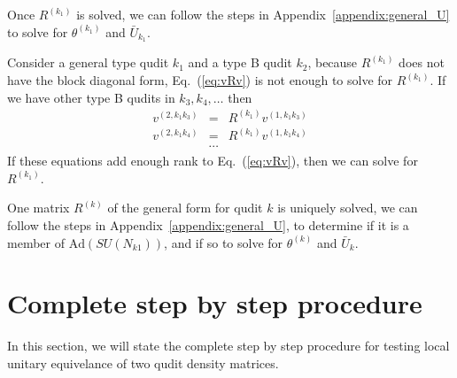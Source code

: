 \documentclass{article}
\begin{document}
Once $R^{(k_1)}$ is solved, we can follow the steps in
Appendix~\ref{appendix:general_U} to solve for $\theta^{(k_1)}$ and
$\bar U_{k_1}$.

Consider a general type qudit $k_1$ and a type B qudit $k_2$, because
$R^{(k_1)}$ does not have the block diagonal form, Eq.~(\ref{eq:vRv})
is not enough to solve for $R^{(k_1)}$.  If we have other type B
qudits in $k_3,k_4,\ldots$ then
\begin{eqnarray}
  v^{(2,k_1k_3)} & = &  R^{(k_1)}v^{(1,k_1k_3)} \\
  v^{(2,k_1k_4)} & = &  R^{(k_1)}v^{(1,k_1k_4)} \\
              &\cdots&
\end{eqnarray}
If these equations add enough rank to Eq.~(\ref{eq:vRv}), then we
can solve for $R^{(k_1)}$.

One matrix $R^{(k)}$ of the general form for qudit $k$ is uniquely
solved, we can follow the steps in Appendix~\ref{appendix:general_U},
to determine if it is a member of $\text{Ad}(SU(N_{k1}))$, and if so
to solve for $\theta^{(k)}$ and $\bar U_k$.

\section{Complete step by step procedure}
\label{sec:steps}
In this section, we will state the complete step by step procedure
for testing local unitary equivelance of two qudit density matrices.
\end{document}
